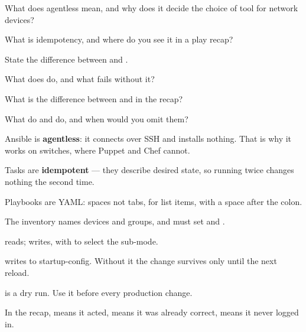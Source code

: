 \begin{checkpoint}
\begin{tightnum}
  \item What does agentless mean, and why does it decide the choice of tool for
        network devices?
  \item What is idempotency, and where do you see it in a play recap?
  \item State the difference between  and .
  \item What does  do, and what fails without it?
  \item What is the difference between  and  in the
        recap?
  \item What do  and  do, and when would you omit them?
\end{tightnum}
\end{checkpoint}

\begin{chaptersummary}
\begin{tight}
  \item Ansible is \textbf{agentless}: it connects over SSH and installs nothing.
        That is why it works on switches, where Puppet and Chef cannot.
  \item Tasks are \textbf{idempotent} --- they describe desired state, so running
        twice changes nothing the second time.
  \item Playbooks are YAML: spaces not tabs, \cmd{-} for list items,
         with a space after the colon.
  \item The inventory names devices and groups, and must set
         and .
  \item {} reads;  writes, with  to
        select the sub-mode.
  \item {} writes to startup-config. Without it the
        change survives only until the next reload.
  \item {} is a dry run. Use it before every production change.
  \item In the recap,  means it acted,  means it was already
        correct,  means it never logged in.
\end{tight}
\end{chaptersummary}

